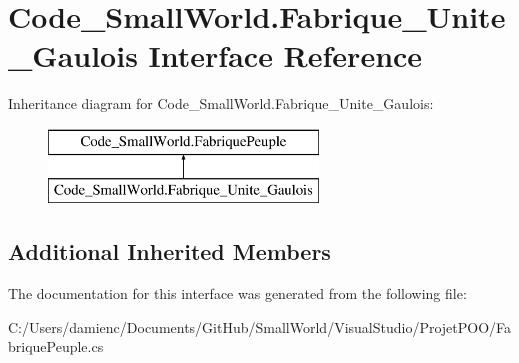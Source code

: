 \hypertarget{interface_code___small_world_1_1_fabrique___unite___gaulois}{\section{Code\-\_\-\-Small\-World.\-Fabrique\-\_\-\-Unite\-\_\-\-Gaulois Interface Reference}
\label{interface_code___small_world_1_1_fabrique___unite___gaulois}
}
Inheritance diagram for Code\-\_\-\-Small\-World.\-Fabrique\-\_\-\-Unite\-\_\-\-Gaulois\-:\begin{figure}[H]
\begin{center}
\leavevmode
\includegraphics[height=2.000000cm]{interface_code___small_world_1_1_fabrique___unite___gaulois}
\end{center}
\end{figure}
\subsection*{Additional Inherited Members}


The documentation for this interface was generated from the following file\-:\begin{DoxyCompactItemize}
\item 
C\-:/\-Users/damienc/\-Documents/\-Git\-Hub/\-Small\-World/\-Visual\-Studio/\-Projet\-P\-O\-O/Fabrique\-Peuple.\-cs\end{DoxyCompactItemize}
